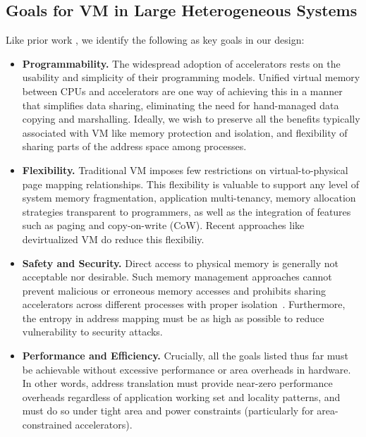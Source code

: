 \subsection{Goals for VM in Large Heterogeneous Systems}
Like prior work \cite{haria:devirtualizing}, we identify the following
as key goals in our design:

\begin{itemize}
        \item \textbf{Programmability.} The widespread adoption of
          accelerators rests on the usability and simplicity of their
          programming models. Unified virtual memory between CPUs and
          accelerators are one way of achieving this in a manner that
          simplifies data sharing, eliminating the need for
          hand-managed data copying and marshalling. Ideally, we wish
          to preserve all the benefits typically associated with VM
          like memory protection and isolation, and flexibility of
          sharing parts of the address space among processes.

        \item \textbf{Flexibility.} Traditional VM imposes few
          restrictions on virtual-to-physical page mapping
          relationships. This flexibility is valuable to support any
          level of system memory fragmentation, application
          multi-tenancy, memory allocation strategies transparent to
          programmers, as well as the integration of features such as
          paging and copy-on-write (CoW). Recent approaches like
          devirtualized VM \cite{haria:devirtualizing} do reduce this
          flexibiliy.

        \item \textbf{Safety and Security.} Direct access to physical
          memory is generally not acceptable nor desirable. Such
          memory management approaches cannot prevent malicious or
          erroneous memory accesses and prohibits sharing accelerators
          across different processes with proper
          isolation~\cite{haria:devirtualizing}. Furthermore, the
          entropy in address mapping must be as high as possible to
          reduce vulnerability to security attacks.

        \item \textbf{Performance and Efficiency.} Crucially, all the
          goals listed thus far must be achievable without excessive
          performance or area overheads in hardware. In other words,
          address translation must provide near-zero performance
          overheads regardless of application working set and locality
          patterns, and must do so under tight area and power
          constraints (particularly for area-constrained accelerators). 


\end{itemize}


